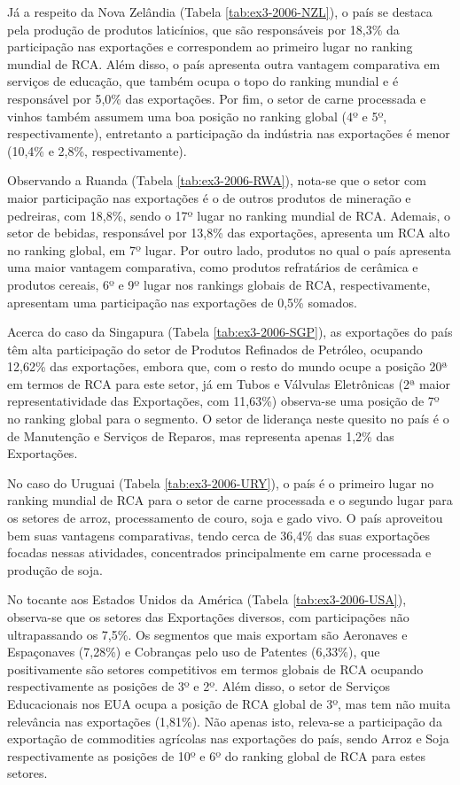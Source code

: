 Já a respeito da Nova Zelândia (Tabela \ref{tab:ex3-2006-NZL}), o país se destaca pela produção de produtos laticínios, que são responsáveis por 18,3\% da participação nas exportações e correspondem ao primeiro lugar no ranking mundial de RCA. Além disso, o país apresenta outra vantagem comparativa em serviços de educação, que também ocupa o topo do ranking mundial e é responsável por 5,0\% das exportações. Por fim, o setor de carne processada e vinhos também assumem uma boa posição no ranking global (4º e 5º, respectivamente), entretanto a participação da indústria nas exportações é menor (10,4\% e 2,8\%, respectivamente).

Observando a Ruanda (Tabela \ref{tab:ex3-2006-RWA}), nota-se que o setor com maior participação nas exportações é o de outros produtos de mineração e pedreiras, com 18,8\%, sendo o 17º lugar no ranking mundial de RCA. Ademais, o setor de bebidas, responsável por 13,8\% das exportações, apresenta um RCA alto no ranking global, em 7º lugar. Por outro lado, produtos no qual o país apresenta uma maior vantagem comparativa, como produtos refratários de cerâmica e produtos cereais, 6º e 9º lugar nos rankings globais de RCA, respectivamente, apresentam uma participação nas exportações de 0,5\% somados.

Acerca do caso da Singapura (Tabela \ref{tab:ex3-2006-SGP}), as exportações do país têm alta participação do setor de Produtos Refinados de Petróleo, ocupando 12,62\% das exportações, embora que, com o resto do mundo ocupe a posição 20ª em termos de RCA para este setor, já em Tubos e Válvulas Eletrônicas (2ª maior representatividade das Exportações, com 11,63\%) observa-se uma posição de 7º no ranking global para o segmento. O setor de liderança neste quesito no país é o de Manutenção e Serviços de Reparos, mas representa apenas 1,2\% das Exportações.

No caso do Uruguai (Tabela \ref{tab:ex3-2006-URY}), o país é o primeiro lugar no ranking mundial de RCA para o setor de carne processada e o segundo lugar para os setores de arroz, processamento de couro, soja e gado vivo. O país aproveitou bem suas vantagens comparativas, tendo cerca de 36,4\% das suas exportações focadas nessas atividades, concentrados principalmente em carne processada e produção de soja.

No tocante aos Estados Unidos da América (Tabela \ref{tab:ex3-2006-USA}), observa-se que os setores das Exportações diversos, com participações não ultrapassando os 7,5\%. Os segmentos que mais exportam são Aeronaves e Espaçonaves (7,28\%) e Cobranças pelo uso de Patentes (6,33\%), que positivamente são setores competitivos em termos globais de RCA ocupando respectivamente as posições de 3º e 2º. Além disso, o setor de Serviços Educacionais nos EUA ocupa a posição de RCA global de 3º, mas tem não muita relevância nas exportações (1,81\%). Não apenas isto, releva-se a participação da exportação de commodities agrícolas nas exportações do país, sendo Arroz e Soja respectivamente as posições de 10º e 6º do ranking global de RCA para estes setores.

